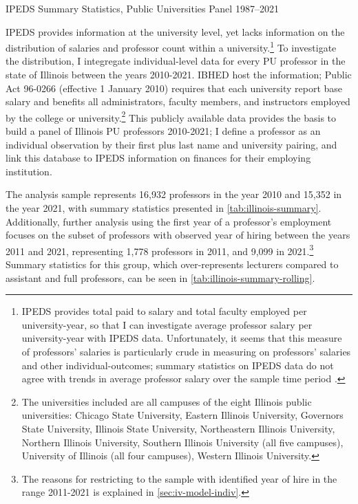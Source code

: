 \documentclass[notitlepage,12pt]{article}
\begin{document}
\begin{table}[h!]
    \singlespacing
    \centering
    \caption{IPEDS Summary Statistics, Public Universities Panel 1987--2021}
    \makebox[\textwidth][c]{}
    \label{tab:ipeds-summary}
\end{table}

IPEDS provides information at the university level, yet lacks information on the distribution of salaries and professor count within a university.\footnote{
    IPEDS provides total paid to salary and total faculty employed per university-year, so that I can investigate average professor salary per university-year with IPEDS data.
    Unfortunately, it seems that this measure of professors' salaries is particularly crude in measuring on professors' salaries and other individual-outcomes; summary statistics on IPEDS data do not agree with trends in average professor salary over the sample time period \citep{aau2021survey}.
}
To investigate the distribution, I integregate individual-level data for every PU professor in the state of Illinois between the years 2010-2021.
IBHED host the information;
Public Act 96-0266 (effective 1 January 2010) requires that each university report base salary and benefits all administrators, faculty members, and instructors employed by the college or university.\footnote{
    The universities included are all campuses of the eight Illinois public universities: Chicago State University, Eastern Illinois University, Governors State University, Illinois State University, Northeastern Illinois University, Northern Illinois University, Southern Illinois University  (all five campuses), University of Illinois (all four campuses), Western Illinois University.
}
This publicly available data provides the basis to build a panel of Illinois PU professors 2010-2021; I define a professor as an individual observation by their first plus last name and university pairing, and link this database to IPEDS information on finances for their employing institution.

The analysis sample represents 16,932 professors in the year 2010 and 15,352 in the year 2021, with summary statistics presented in \autoref{tab:illinois-summary}.
Additionally, further analysis using the first year of a professor's employment focuses on the subset of professors with observed year of hiring between the years 2011 and 2021, representing 1,778 professors in 2011, and 9,099 in 2021.\footnote{
    The reasons for restricting to the sample with identified year of hire in the range 2011-2021 is explained in \autoref{sec:iv-model-indiv}.
}
Summary statistics for this group, which over-represents lecturers compared to assistant and full professors, can be seen in \autoref{tab:illinois-summary-rolling}.
\end{document}
